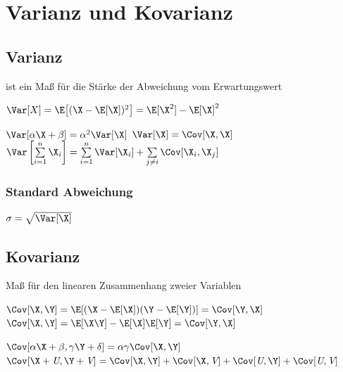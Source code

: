 \documentclass[german,color,6pt]{latex4ei/latex4ei_sheet}
\begin{document}

\vfill

\section{Varianz und Kovarianz}
\begin{sectionbox}
\subsection{Varianz}
	ist ein Maß für die Stärke der Abweichung vom Erwartungswert
	\begin{emphbox}
		$\Var [X] = \E \big[(\X - \E[\X])^2\big] = \E[\X^2] - \E[\X]^2$ 
	\end{emphbox}
	$\Var [ \alpha \X + \beta] = \alpha^2 \Var [\X]$ \hfill $\Var [\X] = \Cov [\X,\X]$\\[0.5em]
	$\Var \left[\sum \limits_{i=1}^n \X_i \right] = \sum \limits_{i=1}^{n} \Var [\X_i] + \sum\limits_{j \not= i} \Cov[\X_i, \X_j]$
	\subsubsection{Standard Abweichung}
	$\sigma = \sqrt{\Var[\X]}$	
\end{sectionbox}

\begin{sectionbox}
\subsection{Kovarianz}
	Maß für den linearen Zusammenhang zweier Variablen
	\begin{emphbox}
		$\Cov [\X,\Y] = \E[(\X- \E[\X])(\Y - \E[\Y])] = \Cov [\Y, \X]$\\[0.5em]
		$\Cov [\X,\Y] = \E [\X\Y] - \E[\X] \E[\Y] = \Cov[\Y, \X]$
	\end{emphbox}
	$\Cov [\alpha \X + \beta, \gamma \Y + \delta] = \alpha \gamma \Cov [\X, \Y]$ \\
	$\Cov [ \X + \textit U, \Y + \textit V] = \Cov [\X, \Y] + \Cov [\X, \textit V] + \Cov [\textit U, \Y] + \Cov [\textit U, \textit V]$ \\
\end{sectionbox}
\end{document}
